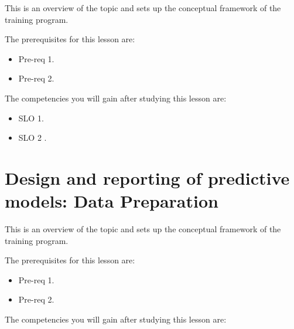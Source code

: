 This is an overview of the topic and sets up the conceptual framework of the training program.




The prerequisites for this lesson are: 




\begin{itemize}
    \item Pre-req 1.
\end{itemize}

\begin{itemize}
    \item Pre-req 2.
\end{itemize}




The competencies you will gain after studying this lesson are: 




\begin{itemize}
    \item SLO 1.
\end{itemize}

\begin{itemize}
    \item SLO 2 .
\end{itemize}

\section{Design and reporting of predictive models: Data Preparation}
\label{sec:design-and-reporting-of-predictive-models-data-preparation}

This is an overview of the topic and sets up the conceptual framework of the training program.




The prerequisites for this lesson are: 




\begin{itemize}
    \item Pre-req 1.
\end{itemize}

\begin{itemize}
    \item Pre-req 2.
\end{itemize}




The competencies you will gain after studying this lesson are: 




